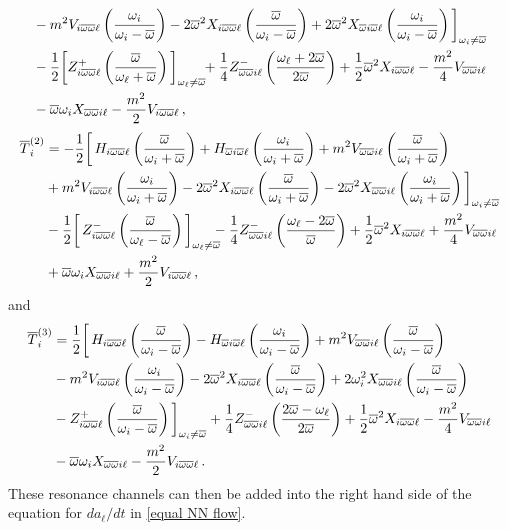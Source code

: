 \documentclass[../PhD.tex]{subfiles}
\newcommand{\ob}{\overline{\omega}}
\begin{document}
\begin{subappendices}
\begin{align}
%
& - m^2 V_{i \ob\ob\ell} \left( \frac{\oi}{\oi - \ob} \right) - 2 \ob^2 X_{i\ob\ob\ell} \left( \frac{\ob}{\oi - \ob} \right) + 2 \ob^2 X_{\ob i \ob\ell} \left( \frac{\oi}{\oi - \ob} \right) \bigg]_{\oi \neq \ob} \nonumber \\
%
& -\frac{1}{2} \bigg[ Z^+_{i\ob\ob\ell} \left( \frac{\ob}{\ol + \ob} \right) \bigg]_{\ol \neq \ob} \!\! + \frac{1}{4} Z^-_{\ob\ob i \ell} \left( \frac{\ol + 2\ob}{2 \ob} \right) + \frac{1}{2} \ob^2 X_{i\ob\ob\ell} - \frac{m^2}{4} V_{\ob\ob i \ell} \nonumber \\
%
& - \ob \oi X_{\ob\ob i\ell} - \frac{m^2}{2} V_{i \ob\ob\ell} \, ,
\end{align}
\begin{align}
\overline{T}^{(2)}_{i} &=  - \frac{1}{2} \bigg[ \, H_{i\ob\ob \ell} \left( \frac{\ob}{\oi + \ob} \right) + H_{\ob i \ob \ell} \left( \frac{\oi}{\oi + \ob} \right) + m^2 V_{\ob \ob i \ell} \left( \frac{\ob}{\oi + \ob} \right) \nonumber \\
%
& + m^2 V_{i\ob\ob\ell} \left( \frac{\oi}{\oi + \ob} \right) - 2 \ob^2 X_{i \ob\ob\ell} \left( \frac{\ob}{\oi + \ob} \right) - 2 \ob^2 X_{\ob\ob i\ell} \left( \frac{\oi}{\oi + \ob} \right) \bigg]_{\oi \neq \ob} \nonumber \\
%
& - \frac{1}{2} \bigg[ \, Z^{-}_{i \ob \ob \ell} \left( \frac{\ob}{\ol - \ob} \right) \bigg]_{\ol \neq \ob} \!\!\!\! - \frac{1}{4} Z^-_{\ob\ob i \ell} \left( \frac{\ol - 2\ob}{\ob} \right) + \frac{1}{2} \ob^2 X_{i\ob\ob\ell} + \frac{m^2}{4} V_{\ob\ob i\ell} \nonumber \\
%
& + \ob \oi X_{\ob\ob i \ell} + \frac{m^2}{2} V_{i \ob\ob \ell} \, ,
\end{align}
and
\begin{align}
\overline{T}^{(3)}_{i} &= \frac{1}{2} \bigg[ \, H_{i\ob\ob\ell} \left( \frac{\ob}{\oi - \ob} \right) - H_{\ob i \ob\ell} \left( \frac{\oi}{\oi - \ob} \right) + m^2 V_{\ob\ob i \ell} \left( \frac{\ob}{\oi - \ob} \right) \nonumber \\
%
& - m^2 V_{i\ob\ob\ell} \left( \frac{\oi}{\oi - \ob} \right) - 2 \ob^2 X_{i\ob\ob\ell} \left( \frac{\ob}{\oi-\ob} \right) + 2 \oi^2 X_{\ob\ob i\ell} \left( \frac{\ob}{\oi-\ob} \right) \nonumber \\
%
& - Z^+_{i\ob\ob\ell} \left( \frac{\ob}{\oi - \ob} \right) \bigg]_{\oi \neq \ob} + \frac{1}{4} Z^-_{\ob\ob i \ell} \left( \frac{2\ob - \ol}{2\ob} \right) + \frac{1}{2} \ob^2 X_{i\ob\ob\ell} - \frac{m^2}{4} V_{\ob\ob i\ell} \nonumber \\
%
&  - \ob \oi X_{\ob\ob i\ell} - \frac{m^2}{2} V_{i\ob\ob\ell} \, .
\end{align}
These resonance channels can then be added into the right hand side of the equation for $d a_\ell / d t$ in \eqref{equal NN flow}.

\end{subappendices}

\end{document}
